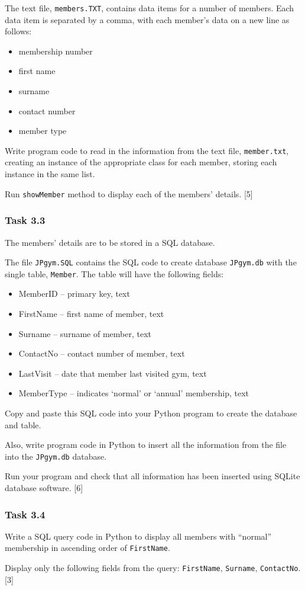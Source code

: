 The text file, \texttt{members.TXT}, contains data items for a number
of members. Each data item is separated by a comma, with each member\textquoteright s
data on a new line as follows: 
\begin{itemize}
\item membership number 
\item first name 
\item surname
\item contact number 
\item member type 
\end{itemize}
Write program code to read in the information from the text file,
\texttt{member.txt}, creating an instance of the appropriate class
for each member, storing each instance in the same list.

Run \texttt{showMember} method to display each of the members\textquoteright{}
details. \hfill{}{[}5{]}

\subsubsection*{Task 3.3 }

The members\textquoteright{} details are to be stored in a SQL database. 

The file \texttt{JPgym.SQL} contains the SQL code to create database
\texttt{JPgym.db} with the single table, \texttt{Member}. The table
will have the following fields: 
\begin{itemize}
\item MemberID -- primary key, text 
\item FirstName -- first name of member, text 
\item Surname -- surname of member, text 
\item ContactNo -- contact number of member, text 
\item LastVisit -- date that member last visited gym, text 
\item MemberType -- indicates \textquoteleft normal\textquoteright{} or
\textquoteleft annual\textquoteright{} membership, text 
\end{itemize}
Copy and paste this SQL code into your Python program to create the
database and table. 

Also, write program code in Python to insert all the information from
the file into the \texttt{JPgym.db} database. 

Run your program and check that all information has been inserted
using SQLite database software. \hfill{}{[}6{]}

\subsubsection*{Task 3.4 }

Write a SQL query code in Python to display all members with \textquotedblleft normal\textquotedblright{}
membership in ascending order of \texttt{FirstName}. 

Display only the following fields from the query: \texttt{FirstName},
\texttt{Surname}, \texttt{ContactNo}. \hfill{} {[}3{]}